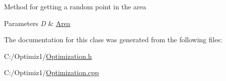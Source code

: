 Method for getting a random point in the area 
\begin{DoxyParams}{Parameters}
{\em D} & \hyperlink{class_area}{Area} \\
\hline
\end{DoxyParams}


The documentation for this class was generated from the following files\+:\begin{DoxyCompactItemize}
\item 
C\+:/\+Optimiz1/\hyperlink{_optimization_8h}{Optimization.\+h}\item 
C\+:/\+Optimiz1/\hyperlink{_optimization_8cpp}{Optimization.\+cpp}\end{DoxyCompactItemize}
